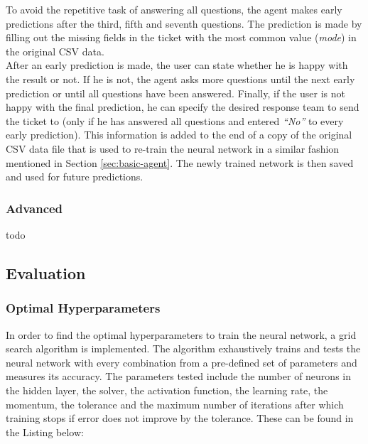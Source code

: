 \documentclass[letterpaper,12pt]{article}
\begin{document}
To avoid the repetitive task of answering all questions, the agent makes early predictions after the third, fifth and seventh questions. The prediction is made by filling out the missing fields in the ticket with the most common value (\textit{mode}) in the original CSV data.\\

After an early prediction is made, the user can state whether he is happy with the result or not. If he is not, the agent asks more questions until the next early prediction or until all questions have been answered. Finally, if the user is not happy with the final prediction, he can specify the desired response team to send the ticket to (only if he has answered all questions and entered \textit{``No''} to every early prediction). This information is added to the end of a copy of the original CSV data file that is used to re-train the neural network in a similar fashion mentioned in Section \ref{sec:basic-agent}. The newly trained network is then saved and used for future predictions.


\subsubsection{Advanced}

todo



\subsection{Evaluation}
\label{sec:evaluation}

\subsubsection{Optimal Hyperparameters}
\label{sec:optimal-hyperparams}

In order to find the optimal hyperparameters to train the neural network, a grid search algorithm is implemented. The algorithm exhaustively trains and tests the neural network with every combination from a pre-defined set of parameters and measures its accuracy. The parameters tested include the number of neurons in the hidden layer, the solver, the activation function, the learning rate, the momentum, the tolerance and the maximum number of iterations after which training stops if error does not improve by the tolerance. These can be found in the Listing below:
\end{document}
